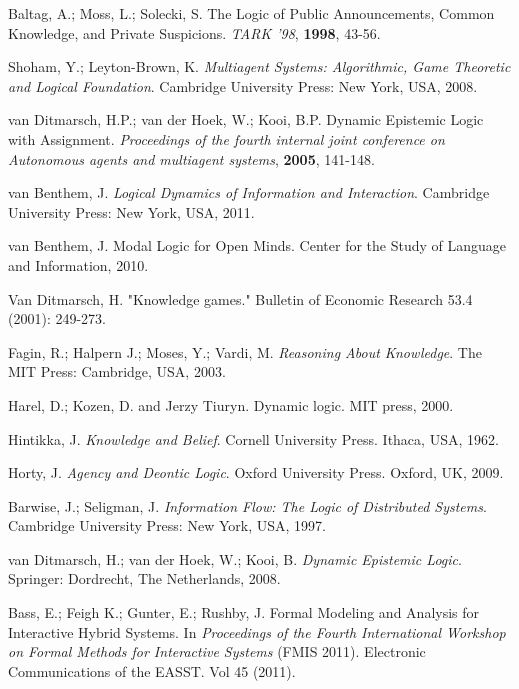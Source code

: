 \begin{thebibliography}{9}
	 	
	 	
	 	Baltag, A.; Moss, L.; Solecki, S. The Logic of Public Announcements, Common Knowledge, and Private Suspicions. {\em TARK '98}, {\bf 1998}, 43-56.
	 	
	 	Shoham, Y.; Leyton-Brown, K. {\em Multiagent Systems: Algorithmic, Game Theoretic and Logical Foundation}. Cambridge University Press: New York, USA, 2008.
	 	
	 	van Ditmarsch, H.P.; van der Hoek, W.; Kooi, B.P. Dynamic Epistemic Logic with Assignment. {\em Proceedings of the fourth internal joint conference on Autonomous agents and multiagent systems}, {\bf 2005}, 141-148.
	 	
	 	van Benthem, J. {\em Logical Dynamics of Information and Interaction}. Cambridge University Press: New York, USA, 2011.
	 	
	 	van Benthem, J. Modal Logic for Open Minds. Center for the Study of Language and Information, 2010.
	 	
	 	Van Ditmarsch, H. "Knowledge games." Bulletin of Economic Research 53.4 (2001): 249-273.
	 	
	 	Fagin, R.; Halpern J.; Moses, Y.; Vardi, M. {\em Reasoning About Knowledge}. The MIT Press: Cambridge, USA, 2003.
	 	
	 	Harel, D.; Kozen, D. and Jerzy Tiuryn. Dynamic logic. MIT press, 2000.
	 	
	 	Hintikka, J. {\em Knowledge and Belief}. Cornell University Press. Ithaca, USA, 1962.
	 	
	 	Horty, J. {\em Agency and Deontic Logic}. Oxford University Press. Oxford, UK, 2009.
	 	
	 	Barwise, J.; Seligman, J. {\em Information Flow: The Logic of Distributed Systems}. Cambridge University Press: New York, USA, 1997.
	 	
	 	van Ditmarsch, H.; van der Hoek, W.; Kooi, B. {\em Dynamic Epistemic Logic}. Springer: Dordrecht, The Netherlands, 2008.
	 	
	 	 Bass, E.; Feigh K.; Gunter, E.; Rushby, J. Formal Modeling and Analysis for Interactive Hybrid Systems. In {\em Proceedings of the Fourth International Workshop on Formal Methods for Interactive Systems} (FMIS 2011). Electronic Communications of the EASST. Vol 45 (2011).
	 	

\end{thebibliography}
